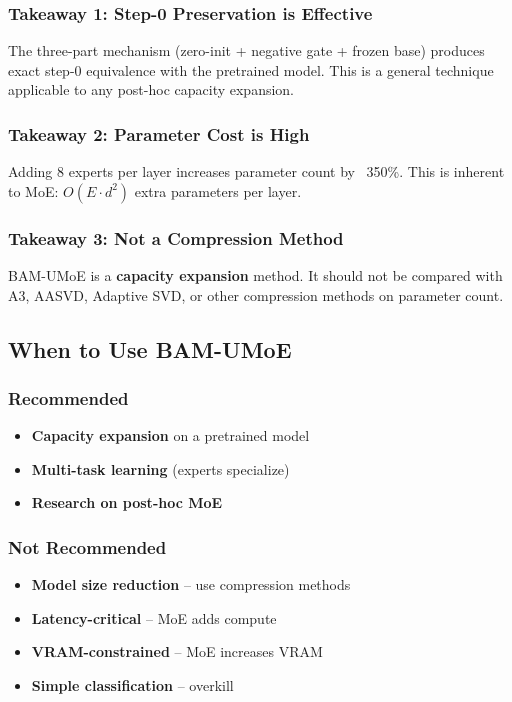 \subsubsection{Takeaway 1: Step-0 Preservation is Effective}

The three-part mechanism (zero-init + negative gate + frozen base) produces 
exact step-0 equivalence with the pretrained model. This is a general 
technique applicable to any post-hoc capacity expansion.

\subsubsection{Takeaway 2: Parameter Cost is High}

Adding 8 experts per layer increases parameter count by ~350\%. 
This is inherent to MoE: $O(E \cdot d^2)$ extra parameters per layer.

\subsubsection{Takeaway 3: Not a Compression Method}

BAM-UMoE is a \textbf{capacity expansion} method. It should not be compared with 
A3, AASVD, Adaptive SVD, or other compression methods on parameter count.

\subsection{When to Use BAM-UMoE}

\subsubsection{Recommended}
\begin{itemize}
\item \textbf{Capacity expansion} on a pretrained model
\item \textbf{Multi-task learning} (experts specialize)
\item \textbf{Research on post-hoc MoE}

\end{itemize}
\subsubsection{Not Recommended}
\begin{itemize}
\item \textbf{Model size reduction} -- use compression methods
\item \textbf{Latency-critical} -- MoE adds compute
\item \textbf{VRAM-constrained} -- MoE increases VRAM
\item \textbf{Simple classification} -- overkill

\end{itemize}
